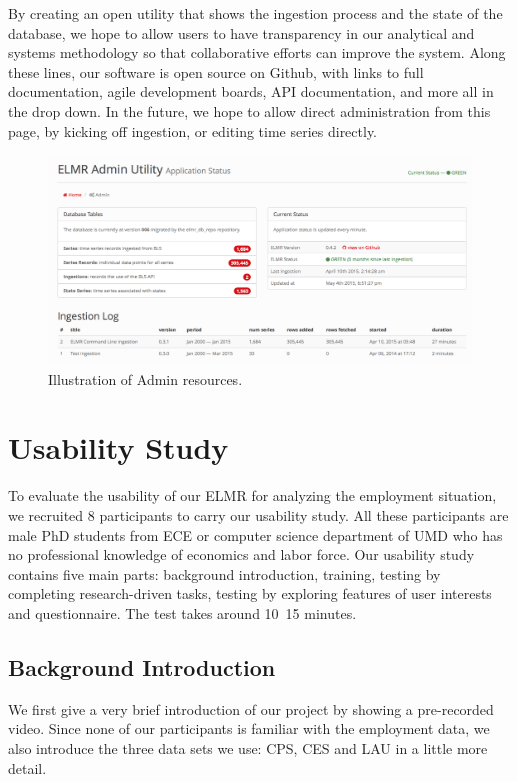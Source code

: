 \documentclass{sigchi}
\begin{document}
By creating an open utility that shows the ingestion process and the state of the database, we hope to allow users to have transparency in our analytical and systems methodology so that collaborative efforts can improve the system. Along these lines, our software is open source on Github, with links to full documentation, agile development boards, API documentation, and more all in the drop down. In the future, we hope to allow direct administration from this page, by kicking off ingestion, or editing time series directly.

\begin{figure}[!ht]
    \centering
    \includegraphics[width=1.75\columnwidth]{figures/Admin.png}
    \caption{Illustration of Admin resources.}
    \label{fig:admin}
\end{figure}

\section{Usability Study}

To evaluate the usability of our ELMR for analyzing the employment situation, we recruited 8 participants to carry our usability study. All these participants are male PhD students from ECE or computer science department of UMD who has no professional knowledge of economics and labor force. Our usability study contains five main parts: background introduction, training, testing by completing research-driven tasks, testing by exploring features of user interests and questionnaire. The test takes around 10~15 minutes.

\subsection{Background Introduction}
We first give a very brief introduction of our project by showing a pre-recorded video. Since none of our participants is familiar with the employment data, we also introduce the three data sets we use: CPS, CES and LAU in a little more detail.
\end{document}
